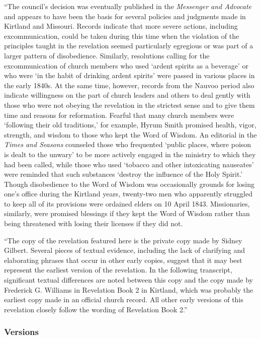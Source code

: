 			``The council's decision was eventually published in the \textit{Messenger and Advocate} and appears to have been the basis for several policies and judgments made in Kirtland and Missouri. Records indicate that more severe actions, including excommunication, could be taken during this time when the violation of the principles taught in the revelation seemed particularly egregious or was part of a larger pattern of disobedience. Similarly, resolutions calling for the excommunication of church members who used `ardent spirits as a beverage' or who were `in the habit of drinking ardent spirits' were passed in various places in the early 1840s. At the same time, however, records from the Nauvoo period also indicate willingness on the part of church leaders and others to deal gently with those who were not obeying the revelation in the strictest sense and to give them time and reasons for reformation. Fearful that many church members were `following their old traditions,' for example, Hyrum Smith promised health, vigor, strength, and wisdom to those who kept the Word of Wisdom. An editorial in the \textit{Times and Seasons} counseled those who frequented `public places, where poison is dealt to the unwary' to be more actively engaged in the ministry to which they had been called, while those who used `tobacco and other intoxicating nauseates' were reminded that such substances `destroy the influence of the Holy Spirit.' Though disobedience to the Word of Wisdom was occasionally grounds for losing one's office during the Kirtland years, twenty-two men who apparently struggled to keep all of its provisions were ordained elders on 10 April 1843. Missionaries, similarly, were promised blessings if they kept the Word of Wisdom rather than being threatened with losing their licenses if they did not.

			``The copy of the revelation featured here is the private copy made by Sidney Gilbert. Several pieces of textual evidence, including the lack of clarifying and elaborating phrases that occur in other early copies, suggest that it may best represent the earliest version of the revelation. In the following transcript, significant textual differences are noted between this copy and the copy made by Frederick G. Williams in Revelation Book 2 in Kirtland, which was probably the earliest copy made in an official church record. All other early versions of this revelation closely follow the wording of Revelation Book 2.''
			
	\subsubsection{Versions}
		\label{DC89-V}
		
